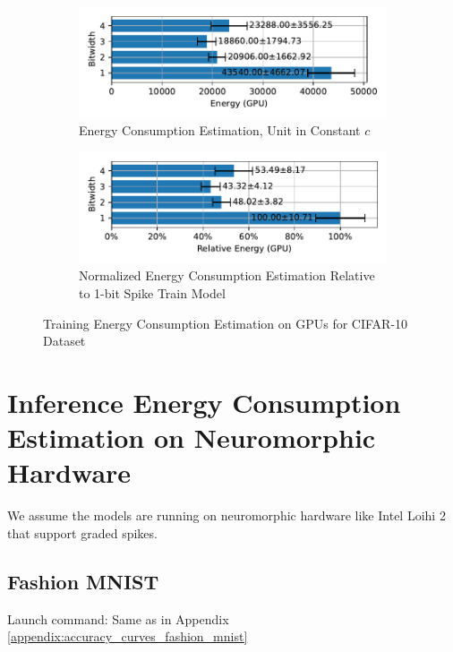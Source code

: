        \begin{figure}[H]
            \centering
            \begin{subfigure}[H]{0.6\textwidth}
                \includegraphics[width=\textwidth]{../standard/CIFAR10/plots/cifar10_train_energy_gpu_horizontal.pdf}
                \caption{Energy Consumption Estimation, Unit in Constant $c$}
            \end{subfigure}
            \hfill
            \begin{subfigure}[H]{0.6\textwidth}
                \includegraphics[width=\textwidth]{../standard/CIFAR10/plots/cifar10_train_relative_energy_gpu_horizontal.pdf}
                \caption{Normalized Energy Consumption Estimation Relative to 1-bit Spike Train Model}
            \end{subfigure}
            \caption{Training Energy Consumption Estimation on GPUs for CIFAR-10 Dataset}
        \end{figure}

\section{Inference Energy Consumption Estimation on Neuromorphic Hardware}
\label{appendix:energy_neuromorphic}

    We assume the models are running on neuromorphic hardware like Intel Loihi 2 that support graded spikes. 

    \subsection{Fashion MNIST}
    \label{appendix:energy_neuromorphic_fashion_mnist}
        Launch command: Same as in Appendix \ref{appendix:accuracy_curves_fashion_mnist}


